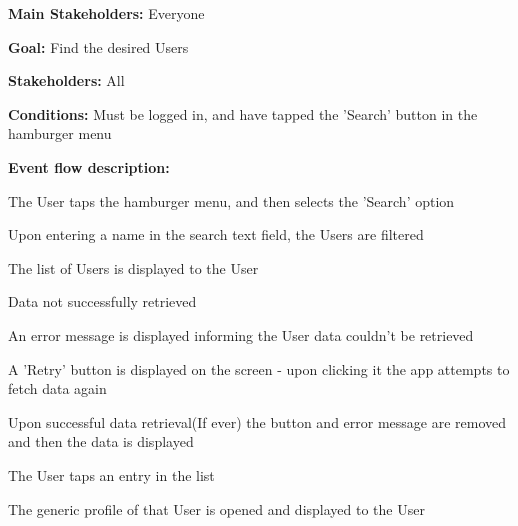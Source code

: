 			\noindent {}
			\begin{packed_item}
				\item \textbf{Main Stakeholders:} Everyone
				\item \textbf{Goal:} Find the desired Users
				\item \textbf{Stakeholders: } All
				\item \textbf{Conditions: } Must be logged in, and have tapped the 'Search' button in the hamburger menu
				\item \textbf{Event flow description: }
				\begin{packed_enum}
					\item The User taps the hamburger menu, and then selects the 'Search' option
					\item Upon entering a name in the search text field, the Users are filtered
					\item The list of Users is displayed to the User
				\end{packed_enum}
				
				\begin{packed_item}
					\item[2.a] Data not successfully retrieved
					\item[] \begin{packed_enum}
						\item An error message is displayed informing the User data couldn't be retrieved
						\item A 'Retry' button is displayed on the screen - upon clicking it the app attempts to fetch data again
						\item Upon successful data retrieval(If ever) the button and error message are removed and then the data is displayed
					\end{packed_enum}
					
					\item[2.a] The User taps an entry in the list
					\item[] \begin{packed_enum}
						\item The generic profile of that User is opened and displayed to the User
					\end{packed_enum}
				\end{packed_item}
			\end{packed_item}
		
